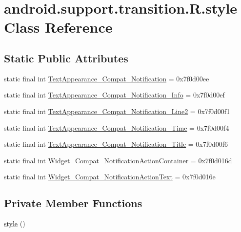 \hypertarget{classandroid_1_1support_1_1transition_1_1_r_1_1style}{}\section{android.\+support.\+transition.\+R.\+style Class Reference}
\label{classandroid_1_1support_1_1transition_1_1_r_1_1style}
\subsection*{Static Public Attributes}
\begin{DoxyCompactItemize}
\item 
static final int \mbox{\hyperlink{classandroid_1_1support_1_1transition_1_1_r_1_1style_ae96b82f217c7c9c896b2ade781c0a3bc}{Text\+Appearance\+\_\+\+Compat\+\_\+\+Notification}} = 0x7f0d00ee
\item 
static final int \mbox{\hyperlink{classandroid_1_1support_1_1transition_1_1_r_1_1style_a4ab9fe59305f96da76de5fd9adee7571}{Text\+Appearance\+\_\+\+Compat\+\_\+\+Notification\+\_\+\+Info}} = 0x7f0d00ef
\item 
static final int \mbox{\hyperlink{classandroid_1_1support_1_1transition_1_1_r_1_1style_ae783c72e586eabfa59bfa1f121cd1ee7}{Text\+Appearance\+\_\+\+Compat\+\_\+\+Notification\+\_\+\+Line2}} = 0x7f0d00f1
\item 
static final int \mbox{\hyperlink{classandroid_1_1support_1_1transition_1_1_r_1_1style_aa3e98d1d135f8b68504e915e4e37e075}{Text\+Appearance\+\_\+\+Compat\+\_\+\+Notification\+\_\+\+Time}} = 0x7f0d00f4
\item 
static final int \mbox{\hyperlink{classandroid_1_1support_1_1transition_1_1_r_1_1style_a5dc9f3af6958a0eb767c72172ed23178}{Text\+Appearance\+\_\+\+Compat\+\_\+\+Notification\+\_\+\+Title}} = 0x7f0d00f6
\item 
static final int \mbox{\hyperlink{classandroid_1_1support_1_1transition_1_1_r_1_1style_a676a5867d0b83e22c08c1e8bb4da1827}{Widget\+\_\+\+Compat\+\_\+\+Notification\+Action\+Container}} = 0x7f0d016d
\item 
static final int \mbox{\hyperlink{classandroid_1_1support_1_1transition_1_1_r_1_1style_af434cc5b5905a9b477e4ba7fb6c0ba54}{Widget\+\_\+\+Compat\+\_\+\+Notification\+Action\+Text}} = 0x7f0d016e
\end{DoxyCompactItemize}
\subsection*{Private Member Functions}
\begin{DoxyCompactItemize}
\item 
\mbox{\hyperlink{classandroid_1_1support_1_1transition_1_1_r_1_1style_ae009b3ce59421fe90ef5be03d62bd2d3}{style}} ()
\end{DoxyCompactItemize}


